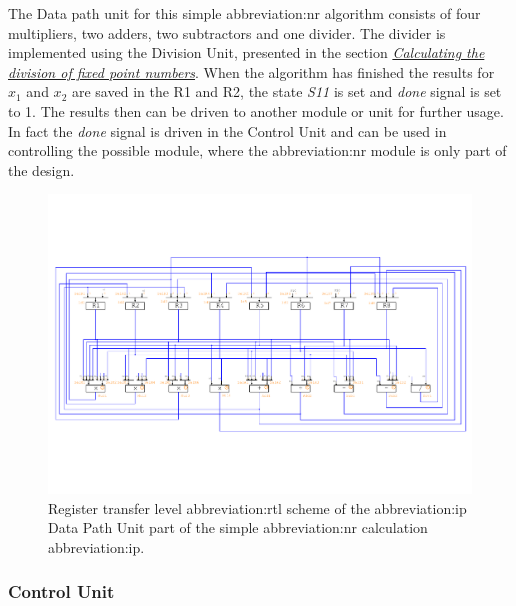 \documentclass[a4paper, twoside, 11pt]{article}
\newcommand{\fbar}{\FloatBarrier}
\begin{document}
            The Data path unit for this simple \gls{abbreviation:nr} algorithm consists of four multipliers, two adders, two subtractors and one divider. The divider is implemented using the Division Unit, presented in the section \hyperref[sec:calculating-the-division-of-fixed-point-numbers]{\textit{Calculating the division of fixed point numbers}}. When the algorithm has finished the results for $x_1$ and $x_2$ are saved in the R1 and R2, the state \textit{S11} is set and \textit{done} signal is set to 1. The results then can be driven to another module or unit for further usage. In fact the \textit{done} signal is driven in the Control Unit and can be used in controlling the possible module, where the \gls{abbreviation:nr} module is only part of the design.
            \begin{figure}[htbp!]
                \centering
                \includegraphics[width=1\textwidth]{src/pdf/simple-nr-rtl.pdf}
                \caption{Register transfer level \gls{abbreviation:rtl} scheme of the \gls{abbreviation:ip} Data Path Unit part of the simple \gls{abbreviation:nr} calculation \gls{abbreviation:ip}.}
                \label{fig:simple-nr-rtl}
                \end{figure}

        \fbar
        \subsubsection{Control Unit}\label{subsubsec:simple-nr-control-unit}
\end{document}
